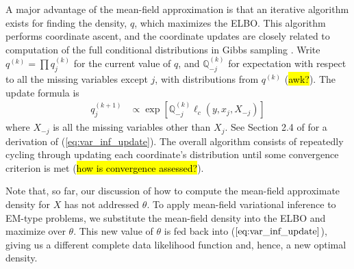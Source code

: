 \documentclass[11pt, oneside]{article}   	%
\newcommand{\bQ}{\mathbb{Q}}
\begin{document}
A major advantage of the mean-field approximation is that an iterative algorithm exists for finding the density, $q$, which maximizes the ELBO. This algorithm performs coordinate ascent, and the coordinate updates are closely related to computation of the full conditional distributions in Gibbs sampling \citep{need}. Write $q^{(k)} = \prod q_j^{(k)}$ for the current value of $q$, and $\bQ^{(k)}_{-j}$ for expectation with respect to all the missing variables except $j$, with distributions from $q^{(k)}$ (\hl{awk?}). The update formula is
%
\begin{align}
    q_j^{(k+1)} &\propto \exp \left[ \bQ^{(k)}_{-j} \ell_c(y, x_j, X_{-j}) \right] \label{eq:var_inf_update}
\end{align}
%
where $X_{-j}$ is all the missing variables other than $X_j$. See Section 2.4 of \citet{Ble17} for a derivation of (\ref{eq:var_inf_update}). The overall algorithm consists of repeatedly cycling through updating each coordinate's distribution until some convergence criterion is met (\hl{how is convergence assessed?}).

Note that, so far, our discussion of how to compute the mean-field approximate density for $X$ has not addressed $\theta$. To apply mean-field variational inference to EM-type problems, we substitute the mean-field density into the ELBO and maximize over $\theta$. This new value of $\theta$ is fed back into ($\ref{eq:var_inf_update}$), giving us a different complete data likelihood function and, hence, a new optimal density.


\newpage
\end{document}
